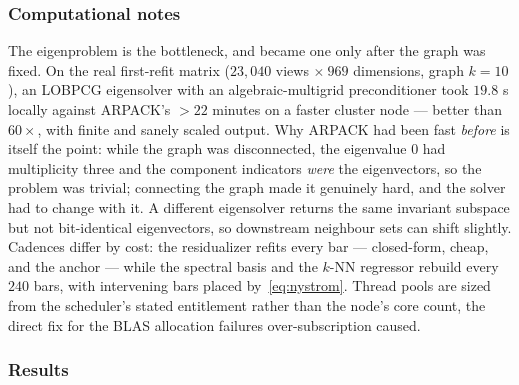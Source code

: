 \subsubsection{Computational notes}

The eigenproblem is the bottleneck, and became one only after the graph was fixed.
On the real first-refit matrix ($23{,}040$ views $\times\ 969$ dimensions, graph
$k = 10$), an LOBPCG eigensolver with an algebraic-multigrid preconditioner took
$19.8$ s locally against ARPACK's $>22$ minutes on a faster cluster node --- better
than $60\times$, with finite and sanely scaled output. Why ARPACK had been fast
\emph{before} is itself the point: while the graph was disconnected, the eigenvalue
$0$ had multiplicity three and the component indicators \emph{were} the
eigenvectors, so the problem was trivial; connecting the graph made it genuinely
hard, and the solver had to change with it. A different eigensolver returns the
same invariant subspace but not bit-identical eigenvectors, so downstream neighbour
sets can shift slightly. Cadences differ by cost: the residualizer refits every bar
--- closed-form, cheap, and the anchor --- while the spectral basis and the $k$-NN
regressor rebuild every $240$ bars, with intervening bars placed
by~\eqref{eq:nystrom}. Thread pools are sized from the scheduler's stated
entitlement rather than the node's core count, the direct fix for the BLAS
allocation failures over-subscription caused.

\subsubsection{Results}

